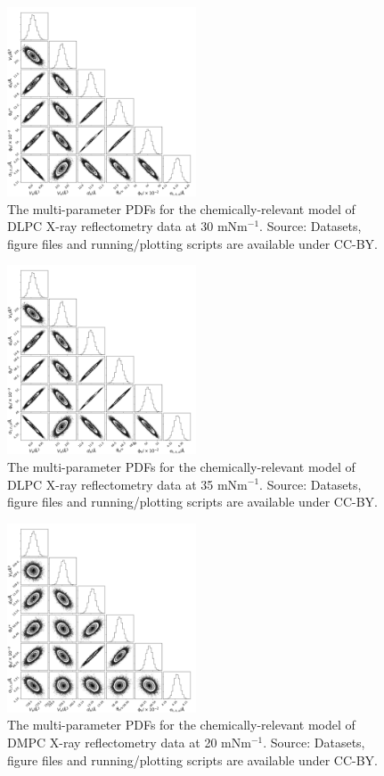 \documentclass[11pt,a4paper]{article}
\begin{document}
\begin{figure}[h]
	\centering
	\includegraphics[width=0.50\textwidth]{figures/dlpc3_all_corner}
	\caption{The multi-parameter PDFs for the chemically-relevant model of DLPC X-ray reflectometry data at 30 mNm$^{-1}$. Source: Datasets, figure files and running/plotting scripts are available under CC-BY.\cite{mccluskey_2018}}
	\label{fig:dlpc4}
\end{figure}
\begin{figure}
	\centering
	\includegraphics[width=0.50\textwidth]{figures/dlpc4_all_corner}
	\caption{The multi-parameter PDFs for the chemically-relevant model of DLPC X-ray reflectometry data at 35 mNm$^{-1}$. Source: Datasets, figure files and running/plotting scripts are available under CC-BY.\cite{mccluskey_2018}}
	\label{fig:dlpc5}
\end{figure}
\begin{figure}[h]
	\centering
	\includegraphics[width=0.50\textwidth]{figures/dmpc1_all_corner}
	\caption{The multi-parameter PDFs for the chemically-relevant model of DMPC X-ray reflectometry data at 20 mNm$^{-1}$. Source: Datasets, figure files and running/plotting scripts are available under CC-BY.\cite{mccluskey_2018}}
	\label{fig:dmpc2}
\end{figure}
\end{document}
